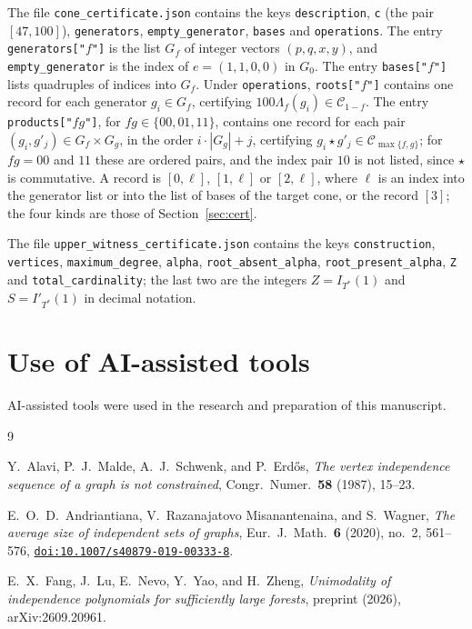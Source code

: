 \documentclass{amsart}
\numberwithin{equation}{section}
\theoremstyle{plain}
\theoremstyle{definition}
\theoremstyle{remark}
\newcommand{\C}{\mathcal{C}}
\begin{document}
The file \texttt{cone\_certificate.json} contains the keys \texttt{description}, \texttt{c} (the pair $[47,100]$), \texttt{generators}, \texttt{empty\_generator}, \texttt{bases} and \texttt{operations}. The entry \texttt{generators["$f$"]} is the list $G_f$ of integer vectors $(p,q,x,y)$, and \texttt{empty\_generator} is the index of $e=(1,1,0,0)$ in $G_0$. The entry \texttt{bases["$f$"]} lists quadruples of indices into $G_f$. Under \texttt{operations}, \texttt{roots["$f$"]} contains one record for each generator $g_i\in G_f$, certifying $100\Lambda_f(g_i)\in\C_{1-f}$. The entry \texttt{products["$fg$"]}, for $fg\in\{00,01,11\}$, contains one record for each pair $(g_i,g'_j)\in G_f\times G_g$, in the order $i\cdot|G_g|+j$, certifying $g_i\star g'_j\in\C_{\max\{f,g\}}$; for $fg=00$ and $11$ these are ordered pairs, and the index pair $10$ is not listed, since $\star$ is commutative. A record is $[0,\ell]$, $[1,\ell]$ or $[2,\ell]$, where $\ell$ is an index into the generator list or into the list of bases of the target cone, or the record $[3]$; the four kinds are those of Section~\ref{sec:cert}.

The file \texttt{upper\_witness\_certificate.json} contains the keys \texttt{construction}, \texttt{vertices}, \texttt{maximum\_degree}, \texttt{alpha}, \texttt{root\_absent\_alpha}, \texttt{root\_present\_alpha}, \texttt{Z} and \texttt{total\_cardinality}; the last two are the integers $Z=I_{T^*}(1)$ and $S=I'_{T^*}(1)$ in decimal notation.

\section*{Use of AI-assisted tools}
AI-assisted tools were used in the research and preparation of this manuscript.

\begin{thebibliography}{9}

 Y.~Alavi, P.~J.~Malde, A.~J.~Schwenk, and P.~Erd\H{o}s, \emph{The vertex independence sequence of a graph is not constrained}, Congr.\ Numer.\ \textbf{58} (1987), 15--23.

 E.~O.~D.~Andriantiana, V.~Razanajatovo Misanantenaina, and S.~Wagner, \emph{The average size of independent sets of graphs}, Eur.\ J.\ Math.\ \textbf{6} (2020), no.~2, 561--576, \href{https://doi.org/10.1007/s40879-019-00333-8}{\nolinkurl{doi:10.1007/s40879-019-00333-8}}.

 E.~X.~Fang, J.~Lu, E.~Nevo, Y.~Yao, and H.~Zheng, \emph{Unimodality of independence polynomials for sufficiently large forests}, preprint (2026), arXiv:2609.20961.

\end{thebibliography}
\end{document}

